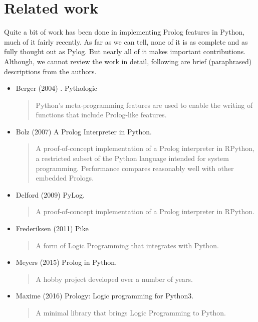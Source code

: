 \section{Related work}

Quite a bit of work has been done in implementing Prolog features in Python, much of it fairly recently. As far as we can tell, none of it is as complete and as fully thought out as Pylog. But nearly all of it makes important contributions. Although, we cannot review the work in detail, following are brief (paraphrased) descriptions from the authors.

\begin{itemize}[label=$~$]

\item Berger (2004) \cite{berger2004}. Pythologic 
\begin{quote}
Python's meta-programming features are used to enable the writing of functions that include Prolog-like features.
\end{quote}

\item Bolz (2007) \cite{Bolz2007} A Prolog Interpreter in Python.  
\begin{quote}
A proof-of-concept implementation of a Prolog interpreter in RPython, a restricted subset of the Python language intended for system programming. Performance compares reasonably well with other embedded Prologs.
\end{quote}

\item Delford (2009) \cite{Delford2009} PyLog. 
\begin{quote}
A proof-of-concept implementation of a Prolog interpreter in RPython.
\end{quote}

\item Frederiksen (2011) \cite{Frederiksen2011} Pike
\begin{quote}
A form of Logic Programming that integrates with Python.
\end{quote}

\item Meyers (2015) \cite{Meyers2015} Prolog in Python. \begin{quote}A hobby project developed over a number of years.\end{quote}

\item Maxime (2016) \cite{Maxime2016} Prology: Logic programming for Python3.
\begin{quote}
A minimal library that brings Logic Programming to Python.
\end{quote}


\end{itemize}
